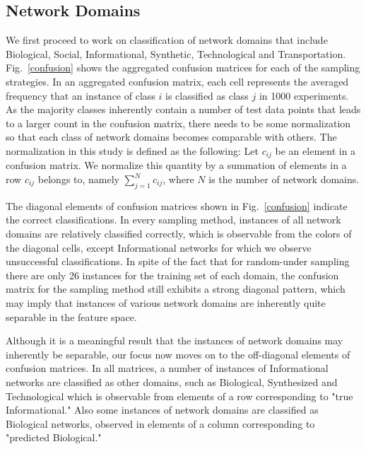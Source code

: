  
\subsection*{Network Domains} 
We first proceed to work on classification of network domains that include Biological, Social, Informational, Synthetic, Technological and Transportation. Fig.~\ref{confusion} shows the aggregated confusion matrices for each of the sampling strategies. In an aggregated confusion matrix, each cell represents the averaged frequency that an instance of class $i$ is classified as class $j$ in 1000 experiments. As the majority classes inherently contain a number of test data points that leads to a larger count in the confusion matrix, there needs to be some normalization so that each class of network domains becomes comparable with others. The normalization in this study is defined as the following: Let $c_{ij}$ be an element in a confusion matrix. We normalize this quantity by a summation of elements in a row $c_{ij}$ belongs to, namely $\sum_{j=1}^N c_{ij}$, where $N$ is the number of network domains. 

The diagonal elements of confusion matrices shown in Fig.~\ref{confusion} indicate the correct classifications. In every sampling method, instances of all network domains are relatively classified correctly, which is observable from the colors of the diagonal cells, except Informational networks for which we observe unsuccessful classifications. In spite of the fact that for random-under sampling there are only 26 instances for the training set of each domain, the confusion matrix for the sampling method still exhibits a strong diagonal pattern, which may imply that instances of various network domains are inherently quite separable in the feature space.

Although it is a meaningful result that the instances of network domains may inherently be separable, our focus now moves on to the off-diagonal elements of confusion matrices. In all matrices, a number of instances of Informational networks are classified as other domains, such as Biological, Synthesized and Technological which is observable from elements of a row corresponding to  "true Informational." Also some instances of network domains are classified as Biological networks, observed in elements of a column corresponding to "predicted Biological." 

